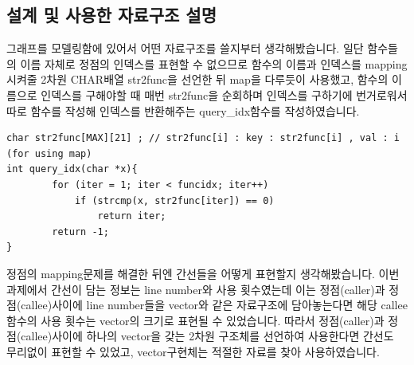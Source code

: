 \documentclass{article}
\begin{document}
    \subsection{설계 및 사용한 자료구조 설명}
        그래프를 모델링함에 있어서 어떤 자료구조를 쓸지부터 생각해봤습니다. 일단 함수들의 이름 자체로 정점의 인덱스를 표현할 수 없으므로 함수의 이름과 인덱스를 
        mapping시켜줄 2차원 CHAR배열 str2func을 선언한 뒤 map을 다루듯이 사용했고, 함수의 이름으로 인덱스를 구해야할 때 매번 str2func을 순회하며 인덱스를 구하기에 번거로워서 
        따로 함수를 작성해 인덱스를 반환해주는 query\_idx함수를 작성하였습니다.
        \begin{verbatim}
char str2func[MAX][21] ; // str2func[i] : key : str2func[i] , val : i   (for using map)
int query_idx(char *x){
        for (iter = 1; iter < funcidx; iter++)
            if (strcmp(x, str2func[iter]) == 0) 
                return iter;
        return -1;	
} 
        \end{verbatim}
        정점의 mapping문제를 해결한 뒤엔 간선들을 어떻게 표현할지 생각해봤습니다. 이번 과제에서 간선이 담는 정보는 line number와 사용 횟수였는데 이는
        정점(caller)과 정점(callee)사이에 line number들을 vector와 같은 자료구조에 담아놓는다면 해당 callee함수의 사용 횟수는 vector의 크기로 표현될 수 있었습니다.
        따라서 정점(caller)과 정점(callee)사이에 하나의 vector을 갖는 2차원 구조체를 선언하여 사용한다면 간선도 무리없이 표현할 수 있었고, vector구현체는 적절한 자료를 찾아
        사용하였습니다. 
        \newpage 
\end{document}

